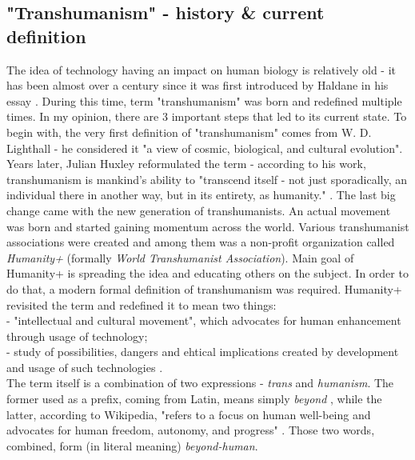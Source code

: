 \documentclass[12pt]{article}
\begin{document}
\subsection{"Transhumanism" - history \& current definition}
	The idea of technology having an impact on human biology is relatively old - it has been almost over a century since it was first introduced by Haldane in his essay \cite{haldane}. During this time, term "transhumanism" was born and redefined multiple times\cite{transhumanismEarlyThinking}. In my opinion, there are 3 important steps that led to its current state. To begin with, the very first definition of "transhumanism" comes from W. D. Lighthall - he considered it "a view of cosmic, biological, and cultural evolution"\cite{transhumanismHistoryLighthall}. Years later, Julian Huxley reformulated the term - according to his work, transhumanism is mankind's ability to "transcend itself - not just sporadically, an individual there in another way, but in its entirety, as humanity." \cite{transhumanismHistoryHuxley}. The last big change came with the new generation of transhumanists. An actual movement was born and started gaining momentum across the world. Various transhumanist associations were created and among them was a non-profit organization called \emph{Humanity+} (formally \emph{World Transhumanist Association}). Main goal of Humanity+ is spreading the idea and educating others on the subject. In order to do that, a modern formal definition of transhumanism was required. Humanity+ revisited the term and redefined it to mean two things: 
	\\- "intellectual and cultural movement", which advocates for human enhancement through usage of technology;
	\\- study of possibilities, dangers and ehtical implications created by development and usage of such technologies \cite{transhumanistFAQ:1}.
	\\The term itself is a combination of two expressions - \emph{trans} and \emph{humanism}. The former used as a prefix, coming from Latin, means simply \emph{beyond} \cite{transTermDictionary}, while the latter, according to Wikipedia, "refers to a focus on human well-being and advocates for human freedom, autonomy, and progress" \cite{humanismTermWiki}. Those two words, combined, form (in literal meaning) \emph{beyond-human}. 
\end{document}

